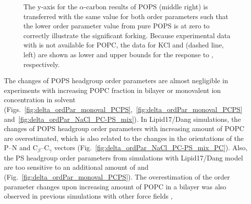 \documentclass[journal=jpcbfk,manuscript=article]{achemso}
\begin{document}
\begin{figure}[tbp!]
{    The y-axis for the $\alpha$-carbon results of POPS (middle right) is transferred
    with the same value for both order parameters such that the lower order
    parameter value from pure POPS is at zero to correctly illustrate the significant forking.
    Because experimental data with  is not available for POPC, the data for KCl and  (dashed line, left)
    are shown as lower and upper bounds for the response to , respectively.
  }
\end{figure} 



The changes of POPS headgroup order parameters are almost negligible in experiments with increasing POPC fraction in bilayer
or monovalent ion concentration in solvent
(Figs.~\ref{fig:delta_ordPar_monoval_PCPS},~\ref{fig:delta_ordPar_monoval_PCPS} and~\ref{fig:delta_ordPar_NaCl_PC-PS_mix}).
In Lipid17/Dang simulations, the changes of POPS headgroup order parameters with increasing amount of POPC
are overestimated, which is also related to the changes in the orientations of the P--N and C$_{\beta}$--C$_{\gamma}$
vectors (Fig.~\ref{fig:delta_ordPar_NaCl_PC-PS_mix_PC}). 
Also, the PS headgroup order parameters from simulations with Lipid17/Dang model
are too sensitive to an additional amount of  and  
(Fig.~\ref{fig:delta_ordPar_monoval_PCPS}).
The overestimation of the order parameter changes upon increasing amount of POPC in a bilayer 
was also observed in previous simulations with other force fields \cite{NMRlipidsIV}, 
\end{document}

